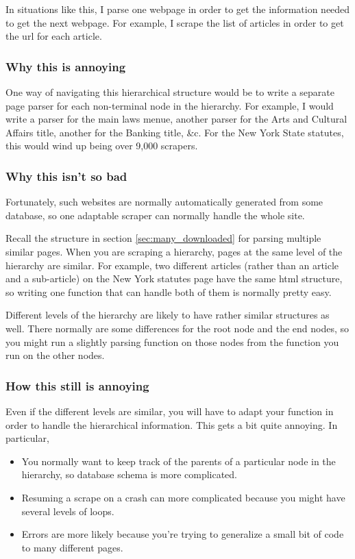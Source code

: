 \documentclass{article}
\begin{document}
In situations like this, I parse one webpage in order to get the information
needed to get the next webpage. For example, I scrape the list of articles
in order to get the url for each article.

\subsubsection{Why this is annoying}
One way of navigating this hierarchical structure would be to write a
separate page parser for each non-terminal node in the hierarchy.
For example, I would write a parser for the main laws menue, another
parser for the Arts and Cultural Affairs title, another for the Banking
title, \&c. For the New York State statutes, this would wind up being
over 9,000 scrapers.

\subsubsection{Why this isn't so bad}
Fortunately, such websites are normally automatically generated from
some database, so one adaptable scraper can normally handle the whole site.

Recall the structure in section \ref{sec:many_downloaded}
for parsing multiple similar pages. When you are scraping a hierarchy,
pages at the same level of the hierarchy are similar.
For example, two different articles (rather than an article and a sub-article)
on the New York statutes page have the same html structure,
so writing one function that can handle both of them is normally pretty easy.

Different levels of the hierarchy are likely to have rather similar
structures as well. There normally are some differences for the root
node and the end nodes, so you might run a slightly parsing function
on those nodes from the function you run on the other nodes.

\subsubsection{How this still is annoying}
Even if the different levels are similar, you will have to adapt your
function in order to handle the hierarchical information. This gets
a bit quite annoying. In particular,
\begin{itemize}
\item You normally want to keep track of the parents of a particular
node in the hierarchy, so database schema is more complicated.
\item Resuming a scrape on a crash can more complicated because you might
have several levels of loops.
\item Errors are more likely because you're trying to generalize a small
bit of code to many different pages.
\end{itemize}
\end{document}
